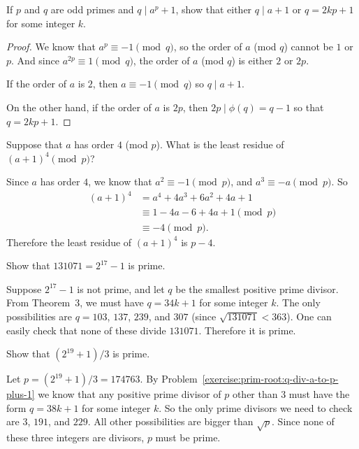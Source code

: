 \label{exercise:prim-root:q-div-a-to-p-plus-1}
If $p$ and $q$ are odd primes and $q\mid a^p + 1$, show that either
$q\mid a + 1$ or $q = 2kp + 1$ for some integer $k$.
\begin{proof}
  We know that $a^p\equiv-1\pmod{q}$, so the order of $a$ (mod $q$)
  cannot be $1$ or $p$. And since $a^{2p}\equiv1\pmod{q}$, the order
  of $a$ (mod $q$) is either $2$ or $2p$.

  If the order of $a$ is $2$, then $a\equiv-1\pmod{q}$ so
  $q\mid a + 1$.

  On the other hand, if the order of $a$ is $2p$, then
  $2p\mid\phi(q) = q - 1$ so that $q = 2kp + 1$.
\end{proof}

 Suppose that $a$ has order $4$ (mod $p$). What is the
least residue of $(a + 1)^4\pmod{p}$?
\begin{solution}
  Since $a$ has order $4$, we know that $a^2\equiv-1\pmod{p}$, and
  $a^3\equiv-a\pmod{p}$. So
  \begin{align*}
    (a + 1)^4
    &= a^4 + 4a^3 + 6a^2 + 4a + 1 \\
    &\equiv 1 - 4a - 6 + 4a + 1 \pmod{p} \\
    &\equiv -4 \pmod{p}.
  \end{align*}
  Therefore the least residue of $(a + 1)^4$ is $p - 4$.
\end{solution}

 Show that $131071 = 2^{17} - 1$ is prime.
\begin{solution}
  Suppose $2^{17} - 1$ is not prime, and let $q$ be the smallest
  positive prime divisor. From Theorem~3, we must have $q = 34k + 1$
  for some integer $k$. The only possibilities are $q = 103$, $137$,
  $239$, and $307$ (since $\sqrt{131071}<363$). One can easily check
  that none of these divide $131071$. Therefore it is prime.
\end{solution}

 Show that $(2^{19} + 1)/3$ is prime.
\begin{solution}
  Let $p = (2^{19} + 1)/3 = 174763$. By
  Problem~\ref{exercise:prim-root:q-div-a-to-p-plus-1} we know that
  any positive prime divisor of $p$ other than $3$ must have the form
  $q = 38k + 1$ for some integer $k$. So the only prime divisors we
  need to check are $3$, $191$, and $229$. All other possibilities are
  bigger than $\sqrt{p}$. Since none of these three integers are
  divisors, $p$ must be prime.
\end{solution}

